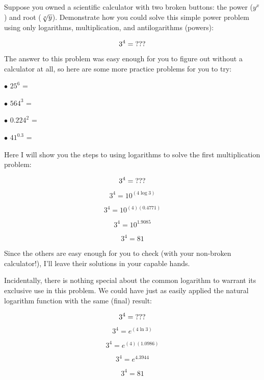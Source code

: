 

Suppose you owned a scientific calculator with two broken buttons: the power ($y^x$) and root ($\root x \of y$).  Demonstrate how you could solve this simple power problem using only logarithms, multiplication, and antilogarithms (powers):

$$3^4 = \hbox{???}$$

The answer to this problem was easy enough for you to figure out without a calculator at all, so here are some more practice problems for you to try:

\medskip
\goodbreak
\item{$\bullet$} $25^6$ = 
\vskip 5pt
\item{$\bullet$} $564^3$ = 
\vskip 5pt
\item{$\bullet$} $0.224^2$ = 
\vskip 5pt
\item{$\bullet$} $41^{0.3}$ = 
\medskip







Here I will show you the steps to using logarithms to solve the first multiplication problem:

$$3^4 = \hbox{???}$$

$$3^4 = 10^{(4 \log 3)}$$

$$3^4 = 10^{(4)(0.4771)}$$

$$3^4 = 10^{1.9085}$$

$$3^4 = 81$$

Since the others are easy enough for you to check (with your non-broken calculator!), I'll leave their solutions in your capable hands.







Incidentally, there is nothing special about the common logarithm to warrant its exclusive use in this problem.  We could have just as easily applied the natural logarithm function with the same (final) result:

$$3^4 = \hbox{???}$$

$$3^4 = e^{(4 \ln 3)}$$

$$3^4 = e^{(4)(1.0986)}$$

$$3^4 = e^{4.3944}$$

$$3^4 = 81$$




